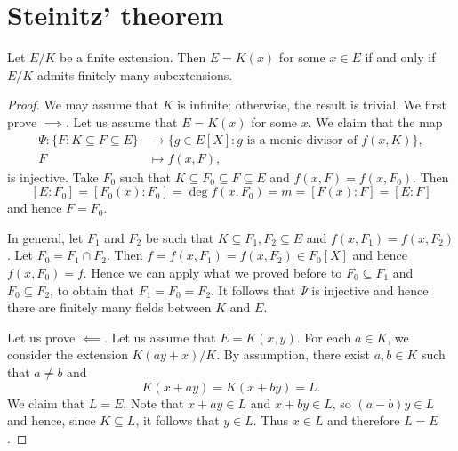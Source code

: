 
\section{Steinitz' theorem}

\begin{theorem}[Steinitz]
    Let $E/K$ be a finite extension. Then $E=K(x)$ for some $x\in E$ 
    if and only if $E/K$ admits finitely many subextensions. 
\end{theorem}

\begin{proof}
     We may assume that $K$ is infinite; otherwise, the result is trivial. 
    We first prove $\implies$. 
    Let us 
    assume that $E=K(x)$ for some $x$. We claim that the map
    \begin{align*}
    \Psi\colon \{F:K\subseteq F\subseteq E\}&\to\{g\in E[X]:g\text{ is a monic divisor of $f(x,K)$}\},\\
    F&\mapsto f(x,F),
    \end{align*}
    is injective. 
    Take $F_0$ such that $K\subseteq F_0\subseteq F\subseteq E$ and  
    $f(x,F)=f(x,F_0)$. Then  
    \[
    [E:F_0]=[F_0(x):F_0]=\deg f(x,F_0)=m=[F(x):F]=[E:F]
    \]
    and hence $F=F_0$.
    
    In general, let  $F_1$ and $F_2$ be such that 
    $K\subseteq F_1,F_2\subseteq E$ and $f(x,F_1)=f(x,F_2)$.
    Let $F_0=F_1\cap F_2$. 
    Then $f=f(x,F_1)=f(x,F_2)\in F_0[X]$ and hence $f(x,F_0)=f$.
    Hence we can apply what we proved before to $F_0\subseteq F_1$
    and $F_0\subseteq F_2$, to obtain that $F_1=F_0=F_2$.
    It follows that $\Psi$ is injective 
    and hence there are finitely many fields between $K$ and $E$. 
    
    Let us prove $\impliedby$.  
    Let us assume that $E=K(x,y)$. For each $a\in K$, we consider
    the extension $K(ay+x)/K$. By assumption, there exist $a,b\in K$ such that
    $a\ne b$ and 
    \[
    K(x+ay)=K(x+by)=L.
    \]
    We claim that $L=E$. Note that 
    $x+ay\in L$ and $x+by\in L$, so $(a-b)y\in L$ and hence, since $K\subseteq L$, it follows that
    $y\in L$. Thus $x\in L$ and therefore $L=E$. 
\end{proof}

